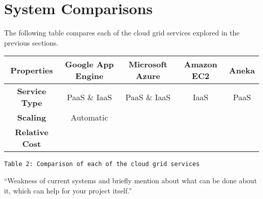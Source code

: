 \chapter{System Comparisons}
The following table compares each of the cloud grid services explored in the previous sections.

\begin{center}
\begin{tabular}{c||cccc}
\hline 
\textbf{Properties} & \textbf{Google App Engine} & \textbf{Microsoft Azure} & \textbf{Amazon EC2} & \textbf{Aneka}\tabularnewline
\hline 
\hline 
\textbf{Service Type} & PaaS \& IaaS & PaaS \& IaaS & IaaS & PaaS \tabularnewline
\textbf{Scaling} & Automatic & & & \tabularnewline
\textbf{Relative Cost} & & & & \tabularnewline
\hline 
\end{tabular}
\texttt{Table 2: Comparison of each of the cloud grid services} %
\end{center}

``Weakness of current systems and briefly mention about what can be done about it, which can help for your project itself.''

